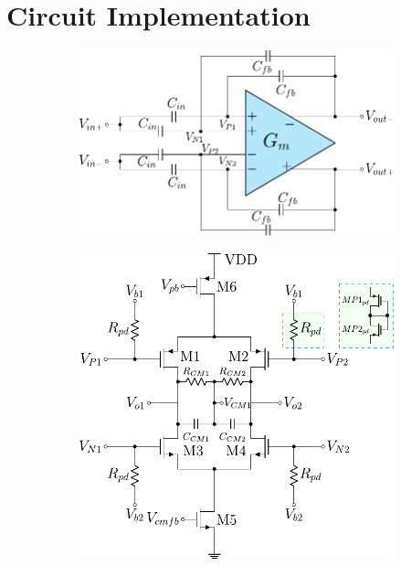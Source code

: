 \section{Circuit Implementation} \label{sec:implementation}


\begin{figure}[!h]
       \centering
       \begin{subfigure}[c]{0.49\linewidth}
           \centering
           \includegraphics[width=\linewidth]{img/DL-CCIA.pdf}
           \caption[]%
           {{\small }}
           \label{fig:DL-CCIA}
        \end{subfigure}
        \hfill
        \begin{subfigure}[c]{0.45\linewidth}  
            \centering 
            \includegraphics[width=\linewidth]{img/CurrentReuse.pdf}

\end{subfigure}
\end{figure}
